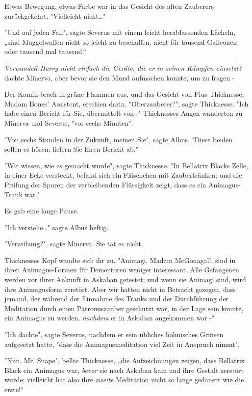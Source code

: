 {Etwas Bewegung, etwas Farbe war in das Gesicht des alten Zauberers zurückgekehrt. "Vielleicht nicht…"

"Und auf jeden Fall", sagte Severus mit einem leicht herablassenden Lächeln, „sind Muggelwaffen nicht so leicht zu beschaffen, nicht für tausend Galleonen oder tausend mal tausend.“

\emph{Verwandelt Harry nicht einfach die Geräte, die er in seinen Kämpfen einsetzt?} dachte Minerva, aber bevor sie den Mund aufmachen konnte, um zu fragen -

Der Kamin brach in grüne Flammen aus, und das Gesicht von Pius Thicknesse, Madam Bones' Assistent, erschien darin. "Oberzauberer?", sagte Thicknesse. "Ich habe einen Bericht für Sie, übermittelt von -" Thicknesses Augen wanderten zu Minerva und Severus, "vor sechs Minuten".

"Von sechs Stunden in der Zukunft, meinen Sie", sagte Albus. "Diese beiden sollen es hören; liefern Sie Ihren Bericht ab."

"Wir wissen, wie es gemacht wurde", sagte Thicknesse. "In Bellatrix Blacks Zelle, in einer Ecke versteckt, befand sich ein Fläschchen mit Zaubertränken; und die Prüfung der Spuren der verbleibenden Flüssigkeit zeigt, dass es ein Animagus-Trank war."

Es gab eine lange Pause.

"Ich verstehe…" sagte Albus heftig.

"Verzeihung?", sagte Minerva. Sie tat es nicht.

Thicknesses Kopf wandte sich ihr zu. "Animagi, Madam McGonagall, sind in ihren Animagus-Formen für Dementoren weniger interessant. Alle Gefangenen werden vor ihrer Ankunft in Askaban getestet; und wenn sie Animagi sind, wird ihre Animagusform zerstört. Aber wir hatten nicht in Betracht gezogen, dass jemand, der während der Einnahme des Tranks und der Durchführung der Meditation durch einen Patronuszauber geschützt war, in der Lage sein könnte, ein Animagus zu werden, \emph{nachdem} er in Askaban angekommen war -"

"Ich dachte", sagte Severus, nachdem er sein übliches höhnisches Grinsen aufgesetzt hatte, "dass die Animagusmeditation viel Zeit in Anspruch nimmt".

"Nun, Mr. Snape", bellte Thicknesse, „die Aufzeichnungen zeigen, dass Bellatrix Black ein Animagus war, \emph{bevor} sie nach Askaban kam und ihre Gestalt zerstört wurde; vielleicht hat also ihre \emph{zweite} Meditation nicht so lange gedauert wie die erste!“

}
